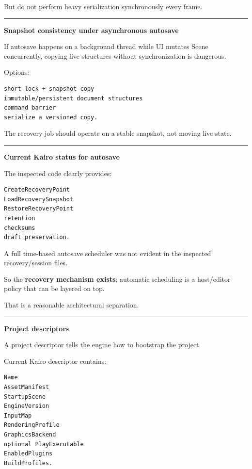 But do not perform heavy serialization synchronously every frame.

\begin{center}\rule{0.5\linewidth}{0.5pt}\end{center}

\textbf{Snapshot consistency under asynchronous autosave}

If autosave happens on a background thread while UI mutates Scene concurrently, copying live structures without synchronization is dangerous.

Options:

\begin{verbatim}
short lock + snapshot copy
immutable/persistent document structures
command barrier
serialize a versioned copy.
\end{verbatim}

The recovery job should operate on a stable snapshot, not moving live state.

\begin{center}\rule{0.5\linewidth}{0.5pt}\end{center}

\textbf{Current Kairo status for autosave}

The inspected code clearly provides:

\begin{verbatim}
CreateRecoveryPoint
LoadRecoverySnapshot
RestoreRecoveryPoint
retention
checksums
draft preservation.
\end{verbatim}

A full time-based autosave scheduler was not evident in the inspected recovery/session files.

So the \textbf{recovery mechanism exists}; automatic scheduling is a host/editor policy that can be layered on top.

That is a reasonable architectural separation.

\begin{center}\rule{0.5\linewidth}{0.5pt}\end{center}

\textbf{Project descriptors}

A project descriptor tells the engine how to bootstrap the project.

Current Kairo descriptor contains:

\begin{verbatim}
Name
AssetManifest
StartupScene
EngineVersion
InputMap
RenderingProfile
GraphicsBackend
optional PlayExecutable
EnabledPlugins
BuildProfiles.
\end{verbatim}

